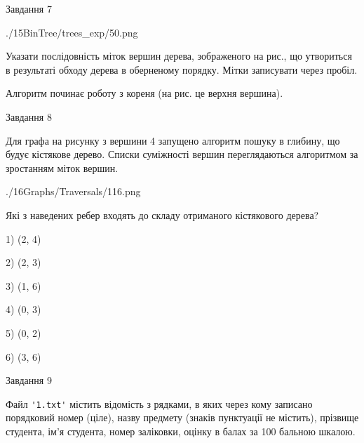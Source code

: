 \documentclass[12pt, ukrainian]{article}
\def\code#1{\Verb!#1!}
\begin{document}
{\vspace{10mm}\par

\newpage
\begin{minipage}[t]{9.7cm}
               
{\begin{center}Завдання {7}\end{center}}
\vspace{-6mm}

\begin{center}
	{./15BinTree/trees_exp/50.png}
\end{center}
Указати послідовність міток вершин дерева, зображеного на рис., що утвориться в результаті обходу дерева в оберненому порядку. Мітки записувати через пробіл.\par Алгоритм починає роботу з кореня (на рис. це верхня вершина).\par

\end{minipage}
\vline \hspace{8mm}
\begin{minipage}[t]{8.0cm}
               
{\begin{center}Завдання {8}\end{center}}
\vspace{-6mm}
Для графа на рисунку з вершини 4 запущено алгоритм пошуку в глибину, що будує кістякове дерево. Списки суміжності вершин переглядаються алгоритмом за зростанням міток вершин.\par
\begin{center}
	{./16Graphs/Traversals/116.png}
\end{center}
\par Які з наведених ребер входять до складу отриманого кістякового дерева?\par
1) (2, 4)\par
2) (2, 3)\par
3) (1, 6)\par
4) (0, 3)\par
5) (0, 2)\par
6) (3, 6)\par
{\vskip 15pt} \par

\end{minipage}

               
{\begin{center}Завдання {9}\end{center}}
\vspace{-6mm}
Файл \code{'1.txt'} містить відомість з рядками, в яких через кому записано поряд\-ковий номер (ціле), назву предмету (знаків пунктуації не містить), прізвище студента, ім'я студента, номер заліковки, оцінку в балах за 100 бальною шкалою.

}
\end{document}
